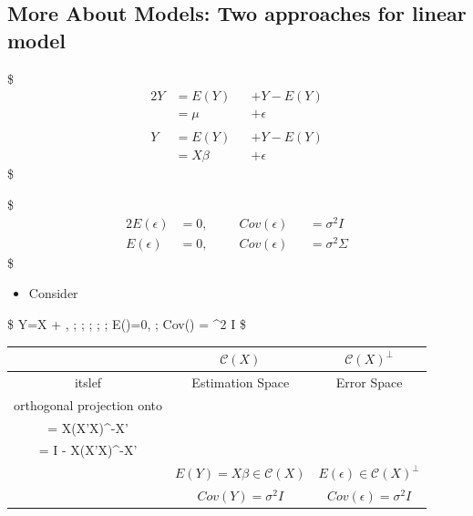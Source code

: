 \documentclass[
]{book}
\providecommand{\tightlist}{%
  \setlength{\itemsep}{0pt}\setlength{\parskip}{0pt}}
\begin{document}
{{{\hypertarget{more-about-models-two-approaches-for-linear-model}{%
\subsection{More About Models: Two approaches for linear model}\label{more-about-models-two-approaches-for-linear-model}}

\$
\begin{alignat}{2}

Y &= E(Y) &&+ Y - E(Y)  \\

&= \mu &&+ \epsilon \tag{Parameter-free approach }

\\
\\

Y &= E(Y) &&+ Y - E(Y)  \\

&= X \beta &&+ \epsilon \tag{Parameter approach}




\end{alignat}
\$

\$
\begin{alignat}{2}

E(\epsilon) &= 0, \; \; \;  && Cov(\epsilon) &&= \sigma^2 I \tag{Ordinary Least Square, OLS}

\\ 

E(\epsilon) &= 0, && Cov(\epsilon) &&= \sigma^2 \Sigma \tag{Generalized Least Square, GLS}



\end{alignat}
\$

\begin{itemize}
\tightlist
\item
  Consider
\end{itemize}

\$
Y=X \beta + \epsilon, ; ; ; ; ; E(\epsilon)=0, ; Cov(\epsilon) = \sigma\^{}2 I
\$

\begin{longtable}[]{@{}ccc@{}}
\toprule
& \(\mathcal{C}(X)\) & \(\mathcal{C}(X)^\perp\) \\
\midrule
\endhead
itslef & Estimation Space & Error Space \\
orthogonal projection onto & \(M \\ = X(X'X)^-X'\) & \(I - M \\= I - X(X'X)^-X'\) \\
& \(E(Y) = X \beta \in \mathcal{C}(X)\) & \(E(\epsilon) \in \mathcal{C}(X)^\perp\) \\
& \(Cov(Y) = \sigma^2 I\) & \(Cov(\epsilon) = \sigma^2 I\) \\
\bottomrule
\end{longtable}

}}}
\end{document}
